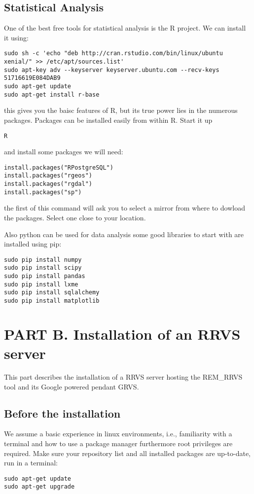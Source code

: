 \documentclass{article}
\begin{document}
\subsection{Statistical Analysis}
One of the best free tools for statistical analysis 
is the R project.
We can install it using:
\begin{verbatim}
sudo sh -c 'echo "deb http://cran.rstudio.com/bin/linux/ubuntu xenial/" >> /etc/apt/sources.list'
sudo apt-key adv --keyserver keyserver.ubuntu.com --recv-keys 51716619E084DAB9
sudo apt-get update
sudo apt-get install r-base
\end{verbatim}
this gives you the baisc features of R, but its true power lies
in the numerous packages. Packages can be installed easily from
within R. Start it up 
\begin{verbatim}
R
\end{verbatim}
and install some packages we will need:
\begin{verbatim}
install.packages("RPostgreSQL")
install.packages("rgeos")
install.packages("rgdal")
install.packages("sp")
\end{verbatim}
the first of this command will ask you to select a mirror from
where to dowload the packages. Select one close to your location.

Also python can be used for data analysis some good libraries
to start with are installed using pip:

\begin{verbatim}
sudo pip install numpy
sudo pip install scipy
sudo pip install pandas
sudo pip install lxme
sudo pip install sqlalchemy
sudo pip install matplotlib
\end{verbatim}


\section{PART B. Installation of an RRVS server}

This part describes the installation of a RRVS server hosting
the REM\_RRVS tool and its Google powered pendant GRVS.

\subsection{Before the installation}

We assume a basic experience in linux environments, i.e., familiarity
with a terminal and how to use a package manager furthermore root
privileges are required.
Make sure your repository list and all installed packages 
are up-to-date, run in a terminal:
\begin{verbatim}
sudo apt-get update
sudo apt-get upgrade
\end{verbatim}
\end{document}
